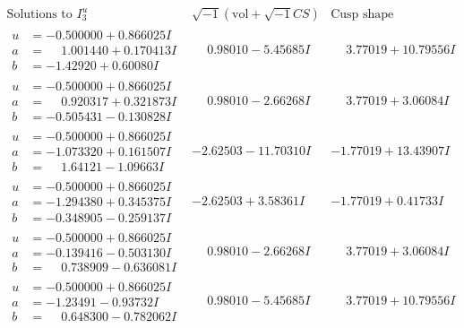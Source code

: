 \documentclass[1p]{elsarticle_modified}
\theoremstyle{definition}
\newcommand{\I}{\sqrt{-1}}
\begin{document}
$$\begin{array}{c|c|c}  
\text{Solutions to }I^u_{3}& \I (\text{vol} + \sqrt{-1}CS) & \text{Cusp shape}\\
 \hline 
\begin{aligned}
u &= -0.500000 + 0.866025 I \\
a &= \phantom{-}1.001440 + 0.170413 I \\
b &= -1.42920 + 0.60080 I\end{aligned}
 & \phantom{-}0.98010 - 5.45685 I & \phantom{-}3.77019 + 10.79556 I \\ \hline\begin{aligned}
u &= -0.500000 + 0.866025 I \\
a &= \phantom{-}0.920317 + 0.321873 I \\
b &= -0.505431 - 0.130828 I\end{aligned}
 & \phantom{-}0.98010 - 2.66268 I & \phantom{-}3.77019 + 3.06084 I \\ \hline\begin{aligned}
u &= -0.500000 + 0.866025 I \\
a &= -1.073320 + 0.161507 I \\
b &= \phantom{-}1.64121 - 1.09663 I\end{aligned}
 & -2.62503 - 11.70310 I & -1.77019 + 13.43907 I \\ \hline\begin{aligned}
u &= -0.500000 + 0.866025 I \\
a &= -1.294380 + 0.345375 I \\
b &= -0.348905 - 0.259137 I\end{aligned}
 & -2.62503 + 3.58361 I & -1.77019 + 0.41733 I \\ \hline\begin{aligned}
u &= -0.500000 + 0.866025 I \\
a &= -0.139416 - 0.503130 I \\
b &= \phantom{-}0.738909 - 0.636081 I\end{aligned}
 & \phantom{-}0.98010 - 2.66268 I & \phantom{-}3.77019 + 3.06084 I \\ \hline\begin{aligned}
u &= -0.500000 + 0.866025 I \\
a &= -1.23491 - 0.93732 I \\
b &= \phantom{-}0.648300 - 0.782062 I\end{aligned}
 & \phantom{-}0.98010 - 5.45685 I & \phantom{-}3.77019 + 10.79556 I \\ \hline\begin{aligned}

\end{aligned}
\end{array}$$
\end{document}
